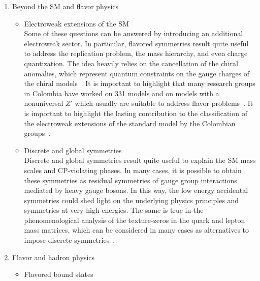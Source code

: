 \documentclass[a4paper,11pt]{article}
\begin{document}
\begin{enumerate}
\item 
Beyond the SM and flavor physics
\begin{itemize}
\item 
Electroweak extensions of the SM\\
Some of these questions can be answered by introducing an additional electroweak sector. In particular, flavored symmetries result quite useful to address the replication problem, the mass hierarchy, and even charge quantization. The idea heavily relies on the cancellation of the chiral anomalies, which represent quantum constraints on the gauge charges of the chiral models~\cite{unalfisicaunaldep, unalfisicaunaldepa, unalfisicaunaldepar, unalfisicaunaldepart, unalfisicaunaldeparta, unalfisicaunaldepartam, unalfisicaunaldepartame}.  It is important to highlight that many research groups in Colombia have worked on 331 models and on models with a nonuniversal $Z'$ which usually are suitable to address flavor problems~\cite{unalf, Diaz:2004fs, unalfis, unalfisi, unalfisic, unalfisica, unalfisicau, unalfisicaun, unalfisicauna, unalfisicaunal, unalfisicaunald, unalfisicaunalde, Benavides:2018rgh, Benavides:2018fzm, Rodriguez:2016cgr,Salazar:2015gxa}. 
It is important to highlight the lasting contribution to  the classification of the electroweak extensions of the standard model by the Colombian  groups~\cite{Ponce:2002sg, Diaz:2004fs, Rojas:2015tqa, Benavides:2016utf, Benavides:2018fzm}.
%
\item
Discrete and global symmetries\\
Discrete and global symmetries result quite useful to explain the SM mass scales and CP-violating phases.  In many cases, it is possible to obtain these symmetries as residual symmetries of gauge group interactions mediated by heavy gauge bosons. In this way, the low energy accidental symmetries could shed light on the underlying physics principles and symmetries at very high energies.  The same is true in the phenomenological analysis of the texture-zeros in the quark and lepton mass matrices, which can be considered in many cases as alternatives to impose discrete symmetries~\cite{Giraldo:2011ya, unalfisicaunaldis, unalfisicaunaldisc, unalfisicaunaldiscr, unalfisicaunaldiscre, Benavides:2020pjx}. 
\end{itemize}
%
\item
Flavor and hadron physics
\begin{itemize}
\item 
Flavored bound states\\

\end{itemize}
\end{enumerate}
\end{document}
